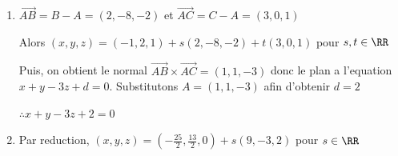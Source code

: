 \documentclass[12pt, a4paper]{article}
\begin{document}
\begin{enumerate}[label=3.\arabic*., start=25]
  \item $\vec{AB} = B - A = (2, -8, -2)$ et $\vec{AC} = C - A = (3, 0, 1)$

    Alors $(x, y, z) = (-1, 2, 1) + s(2, -8, -2) + t(3, 0, 1)$ pour $s, t \in \RR$

    Puis, on obtient le normal $\vec{AB} \times \vec{AC} = (1, 1, -3)$ donc le plan a l'equation $x + y - 3z + d = 0$. Substitutons $A = (1, 1, -3)$ afin d'obtenir $d = 2$

    $\therefore x + y - 3z + 2 = 0$

  \item Par reduction, $(x, y, z) = (-\frac{25}{2}, \frac{13}{2}, 0) + s(9, -3, 2)$ pour $s \in \RR$
\end{enumerate}
\end{document}
